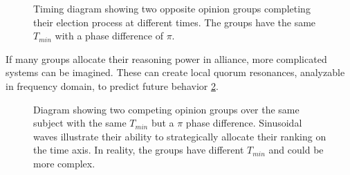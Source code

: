 \documentclass{article}
\begin{document}
\begin{CJK}{UTF8}{gbsn}
\begin{figure}[ht]
        \caption{Timing diagram showing two opposite opinion groups completing their election process at different times. The groups have the same $T_{min}$ with a phase difference of $\pi$.}
        \label{fig:processes}
    \end{figure}

    If many groups allocate their reasoning power in alliance, more complicated systems can be imagined. These can create local quorum resonances, analyzable in frequency domain, to predict future behavior \ref{fig:processes-sinusoidal}.

    \begin{figure}[ht]
        \centering
        \caption{Diagram showing two competing opinion groups over the same subject with the same $T_{min}$ but a $\pi$ phase difference. Sinusoidal waves illustrate their ability to strategically allocate their ranking on the time axis. In reality, the groups have different $T_{min}$ and could be more complex.
            \label{fig:processes-sinusoidal}}
    \end{figure}


\end{CJK}
\end{document}
